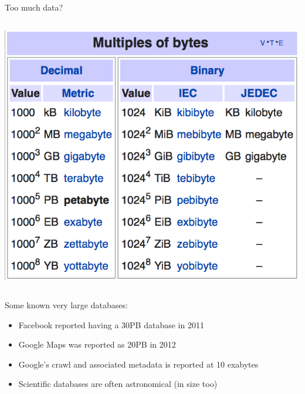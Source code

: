 \begin{frame}{Too much data?}

\begin{columns}[onlytextwidth]
\begin{column}{0.4\textwidth}
\includegraphics[width=1.1\textwidth]{figures/multiples_of_bytes.png}
\end{column}
\end{columns}

Some known very large databases:
\begin{itemize}[-,noitemsep,topsep=-10pt]
\item Facebook reported having a 30PB database in 2011
\item Google Maps was reported as 20PB in 2012
\item Google's crawl and associated metadata is reported at 10 exabytes
\item Scientific databases are often astronomical (in size too)
\end{itemize}
\end{frame}


